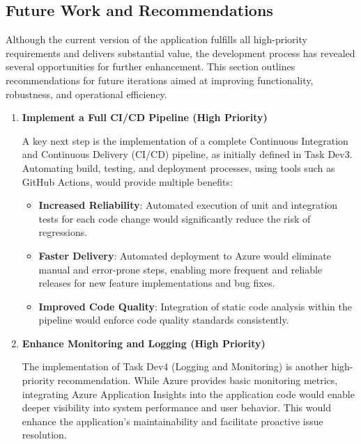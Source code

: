 \subsection{Future Work and Recommendations}

Although the current version of the application fulfills all high-priority requirements and delivers substantial value, the development process has revealed several opportunities for further enhancement. This section outlines recommendations for future iterations aimed at improving functionality, robustness, and operational efficiency.

\begin{enumerate} [leftmargin=0.75cm, label=\textbf{\arabic*.}]

    \item \textbf{Implement a Full CI/CD Pipeline (High Priority)}

    A key next step is the implementation of a complete Continuous Integration and Continuous Delivery (CI/CD) pipeline, as initially defined in Task Dev3. Automating build, testing, and deployment processes, using tools such as GitHub Actions, would provide multiple benefits:

    \begin{itemize} [leftmargin=0.75cm, label=$\bullet$]

        \item \textbf{Increased Reliability}: Automated execution of unit and integration tests for each code change would significantly reduce the risk of regressions. 

        \item \textbf{Faster Delivery}: Automated deployment to Azure would eliminate manual and error-prone steps, enabling more frequent and reliable releases for new feature implementations and bug fixes. 

        \vspace{1cm}

        \item \textbf{Improved Code Quality}: Integration of static code analysis within the pipeline would enforce code quality standards consistently.

    \end{itemize}

    \item \textbf{Enhance Monitoring and Logging (High Priority)}

    The implementation of Task Dev4 (Logging and Monitoring) is another high-priority recommendation. While Azure provides basic monitoring metrics, integrating Azure Application Insights into the application code would enable deeper visibility into system performance and user behavior. This would enhance the application's maintainability and facilitate proactive issue resolution.


\end{enumerate}
